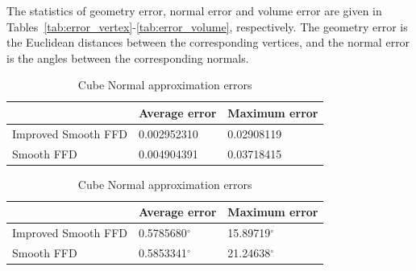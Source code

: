 \documentclass[3p]{elsarticle}
\begin{document}
The statistics of geometry error, normal error and volume error are given in Tables~\ref{tab:error_vertex}-\ref{tab:error_volume}, respectively. The geometry error is the Euclidean distances
between the corresponding vertices, and the normal error is the angles between the corresponding normals.


\begin{table}[htbp]
\begin{center}
	\begin{minipage}[c]{0.47\textwidth}
	\footnotesize
	\centering
	\caption{Cube Geometry approximation errors}
	\begin{tabular}{lll}
		\hline
		& Average error & Maximum error \\
		\hline
			Improved Smooth FFD & 0.002952310 & 0.02908119 \\
			Smooth FFD & 0.004904391 & 0.03718415 \\
		\hline
	\end{tabular}
	\label{tab:error_vertex}
	\end{minipage}
	\begin{minipage}[c]{0.52\textwidth}
	\footnotesize
	\centering
	\caption{Cube Normal approximation errors}
	\begin{tabular}{lll}
		\hline
			& Average error & Maximum error \\
		\hline
			Improved Smooth FFD & 0.5785680$^\circ$ & 15.89719$^\circ$ \\
			Smooth FFD & 0.5853341$^\circ$ & 21.24638$^\circ$ \\
		\hline
	\end{tabular}
	\label{tab:error_normal}
	\end{minipage}
\end{center}
\end{table}
\end{document}
